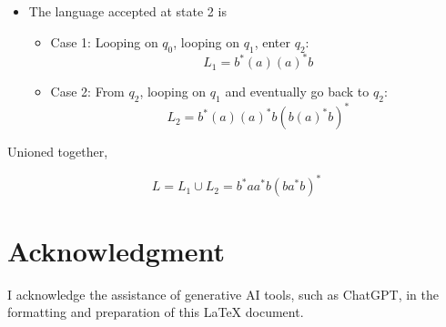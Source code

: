 \documentclass[12pt]{article}
\begin{document}
\section{}
\begin{center}
\end{center}
\begin{itemize}
    \item The language accepted at state 2 is 
    \begin{itemize}
        \item Case 1: Looping on \(q_0\), looping on \(q_1\), enter \(q_2\):
            \[L_1 = b^*(a)(a)^*b\]
        \item Case 2: From \(q_2\), looping on \(q_1\) and eventually go back to \(q_2\):
            \[L_2 = b^*(a)(a)^*b(b(a)^*b)^*\]
    \end{itemize}
    
\end{itemize}
Unioned together, 
    \begin{center}
        \[L = L_1 \cup L_2 = b^*aa^*b(ba^*b)^*\]
    \end{center}

    \section*{Acknowledgment}
    I acknowledge the assistance of generative AI tools, such as ChatGPT, in the formatting and preparation of this LaTeX document.
 
\end{document}

